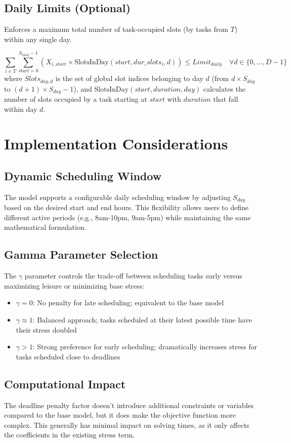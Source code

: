 \documentclass{article}
\begin{document}
\subsection{Daily Limits (Optional)}
Enforces a maximum total number of task-occupied slots (by tasks from $T$) within any single day.

\[
\sum_{i \in T} \sum_{start=0}^{S_{total}-1} \left( X_{i,start} \times \text{SlotsInDay}(start, dur\_slots_i, d) \right) \le Limit_{daily} \quad \forall d \in \{0, ..., D-1\}
\]
where $Slots_{day, d}$ is the set of global slot indices belonging to day $d$ (from $d \times S_{day}$ to $(d+1) \times S_{day} - 1$), and $\text{SlotsInDay}(start, duration, day)$ calculates the number of slots occupied by a task starting at $start$ with $duration$ that fall within day $d$.

\section{Implementation Considerations}

\subsection{Dynamic Scheduling Window}
The model supports a configurable daily scheduling window by adjusting $S_{day}$ based on the desired start and end hours. This flexibility allows users to define different active periods (e.g., 8am-10pm, 9am-5pm) while maintaining the same mathematical formulation.

\subsection{Gamma Parameter Selection}
The $\gamma$ parameter controls the trade-off between scheduling tasks early versus maximizing leisure or minimizing base stress:
\begin{itemize}
    \item $\gamma = 0$: No penalty for late scheduling; equivalent to the base model
    \item $\gamma \approx 1$: Balanced approach; tasks scheduled at their latest possible time have their stress doubled
    \item $\gamma > 1$: Strong preference for early scheduling; dramatically increases stress for tasks scheduled close to deadlines
\end{itemize}

\subsection{Computational Impact}
The deadline penalty factor doesn't introduce additional constraints or variables compared to the base model, but it does make the objective function more complex. This generally has minimal impact on solving times, as it only affects the coefficients in the existing stress term.
\end{document}
